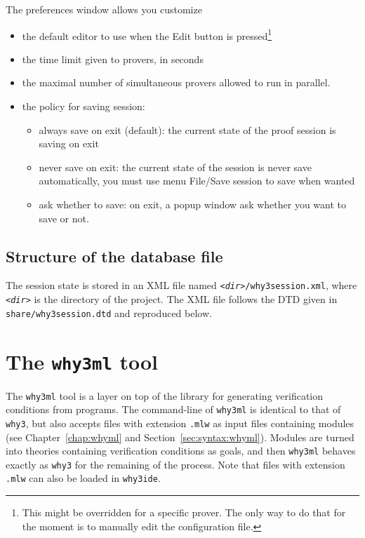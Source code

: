 The preferences window allows you customize
\begin{itemize}
\item the default editor to use when the \textsf{Edit} button is
  pressed\footnote{This might be overridden for a specific prover. The only way
  to do that for the moment is to manually edit the configuration file.}
\item the time limit given to provers, in seconds
\item the maximal number of simultaneous provers allowed to run in parallel.
\item the policy for saving session:
  \begin{itemize}
  \item always save on exit (default): the current state of the proof session is saving on exit
  \item never save on exit: the current state of the session is never save automatically, you must use menu \textsf{File/Save session} to save when wanted
  \item ask whether to save: on exit, a popup window ask whether you
    want to save or not.
  \end{itemize}
\end{itemize}

\subsection{Structure of the database file}


The session state is stored in an XML file named
\texttt{\textsl{<dir>}/why3session.xml}, where \texttt{\textsl{<dir>}}
is the directory of the project.
The XML file follows the DTD given in \texttt{share/why3session.dtd} and reproduced below.


\section{The \texttt{why3ml} tool}

The \texttt{why3ml} tool is a layer on  top of the \why library for
generating verification conditions from \whyml programs.
The command-line of \texttt{why3ml} is identical to that of
\texttt{why3}, but also accepts files with extension \texttt{.mlw} as
input files containing \whyml modules (see Chapter~\ref{chap:whyml}
and Section~\ref{sec:syntax:whyml}). Modules are turned into
theories containing verification conditions as goals, and then
\texttt{why3ml} behaves exactly as \texttt{why3} for the remaining of
the process.
Note that files with extension \texttt{.mlw} can also be loaded in
\texttt{why3ide}.

